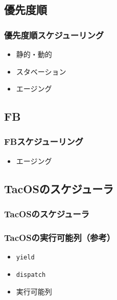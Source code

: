 \documentclass[unicode]{beamer}                   %
\begin{document}
\subsection{優先度順}
\begin{frame}
  \frametitle{優先度順スケジューリング}
  \begin{itemize}
    \item 静的・動的
    \item スタベーション
    \item エージング
  \end{itemize}
\end{frame}

\subsection{FB}
\begin{frame}
  \frametitle{FBスケジューリング}
  \begin{itemize}
    \item エージング
  \end{itemize}
\end{frame}

\subsection{TacOSのスケジューラ}
\begin{frame}[fragile]
  \frametitle{TacOSのスケジューラ}
\end{frame}

\begin{frame}
  \frametitle{TacOSの実行可能列（参考）}
  \begin{itemize}
    \item {\tt yield}
    \item {\tt dispatch}
    \item 実行可能列
  \end{itemize}
\end{frame}
\end{document}
